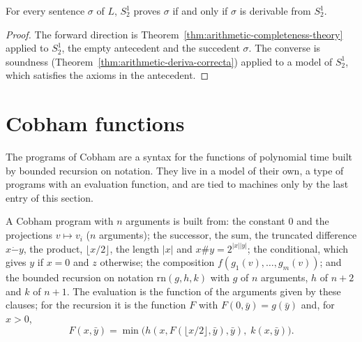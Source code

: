 \begin{theorem}
  \label{thm:arithmetic-demuestra-iff-deriva}
  \leanok
  For every sentence $\sigma$ of $L$, $S^1_2$ proves $\sigma$ if and only if $\sigma$ is derivable
  from $S^1_2$.
\end{theorem}

\begin{proof}
  \leanok
  The forward direction is Theorem~\ref{thm:arithmetic-completeness-theory} applied to $S^1_2$, the
  empty antecedent and the succedent $\sigma$. The converse is soundness
  (Theorem~\ref{thm:arithmetic-deriva-correcta}) applied to a model of $S^1_2$, which satisfies the
  axioms in the antecedent.
\end{proof}

\section{Cobham functions}
\label{sec:arithmetic-cobham}

The programs of Cobham are a syntax for the functions of polynomial time built by bounded recursion on
notation. They live in a model of their own, a type of programs with an evaluation function, and are
tied to machines only by the last entry of this section.

\begin{definition}
  \label{def:arithmetic-cob}
  \leanok
  A Cobham program with $n$ arguments is built from: the constant $0$ and the projections $v \mapsto
  v_i$ ($n$ arguments); the successor, the sum, the truncated difference $x \dot- y$, the product,
  $\lfloor x/2 \rfloor$, the length $|x|$ and $x \# y = 2^{|x||y|}$; the conditional, which gives $y$
  if $x = 0$ and $z$ otherwise; the composition $f(g_1(v), \dots, g_m(v))$; and the bounded recursion
  on notation $\mathrm{rn}(g, h, k)$ with $g$ of $n$ arguments, $h$ of $n + 2$ and $k$ of $n + 1$. The
  evaluation is the function of the arguments given by these clauses; for the recursion it is the
  function $F$ with $F(0, \bar y) = g(\bar y)$ and, for $x > 0$,
  \[
    F(x, \bar y) = \min\bigl(h(x, F(\lfloor x/2 \rfloor, \bar y), \bar y),\; k(x, \bar y)\bigr).
  \]
\end{definition}

